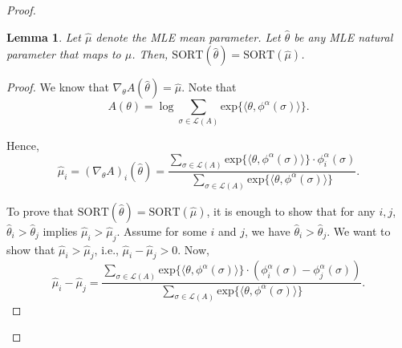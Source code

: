 \documentclass[10pt,letterpaper]{article}
\newtheorem{lemma}{Lemma}
\newcommand{\calL}{{\mathcal{L}}}
\newcommand{\rank}{{\calL(A)}}
\newcommand{\sort}{\text{SORT}}
\newcommand{\phia}{\phi^{\alpha}}
\newcommand{\muhat}{\hat{\mu}}
\newcommand{\that}{\hat{\theta}}
\newcommand{\grad}{\nabla}
\begin{document}
\begin{proof}
\begin{lemma}
Let $\muhat$ denote the MLE mean parameter. Let $\that$ be \emph{any} MLE natural parameter that maps to $\muhat$. Then, $\sort(\that) = \sort(\muhat)$.
\label{lem:muhat-that}
\end{lemma}
\begin{proof}
We know that $\grad_{\theta} A(\that) = \muhat$. Note that 
$$
A(\theta) = \log \sum_{\sigma \in \rank} \text{exp}\lbrace \langle \theta, \phia(\sigma) \rangle \rbrace.
$$

Hence, 
$$
\muhat_i = (\grad_{\theta} A)_i(\that) = \frac{\sum_{\sigma \in \rank} \text{exp}\lbrace \langle \theta, \phia(\sigma) \rangle \rbrace \cdot \phia_i(\sigma)}{\sum_{\sigma \in \rank} \text{exp}\lbrace \langle \theta, \phia(\sigma) \rangle \rbrace}.
$$

To prove that $\sort(\that) = \sort(\muhat)$, it is enough to show that for any $i,j$, $\that_i > \that_j$ implies $\muhat_i > \muhat_j$. Assume for some $i$ and $j$, we have $\that_i > \that_j$. We want to show that $\muhat_i > \muhat_j$, i.e., $\muhat_i - \muhat_j > 0$. Now, 
\begin{equation}
\muhat_i-\muhat_j = \frac{\sum_{\sigma \in \rank} \text{exp}\lbrace \langle \theta, \phia(\sigma) \rangle \rbrace \cdot (\phia_i(\sigma)-\phia_j(\sigma))}{\sum_{\sigma \in \rank} \text{exp}\lbrace \langle \theta, \phia(\sigma) \rangle \rbrace}.
\label{eqn:diff}
\end{equation}


\end{proof}
\end{proof}
\end{document}
